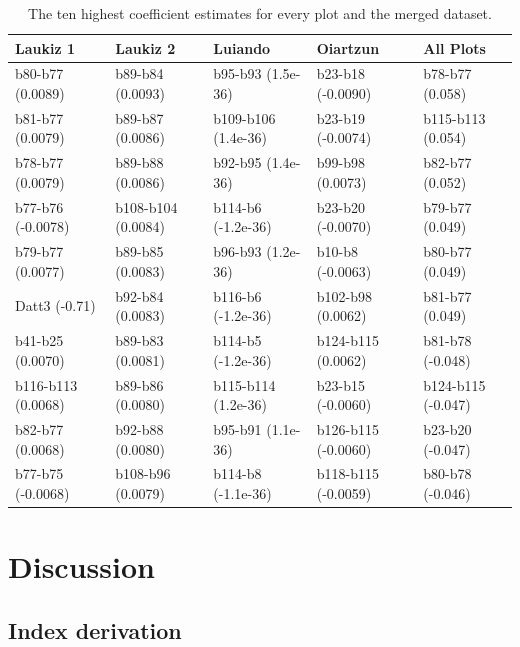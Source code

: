 \documentclass[review]{elsarticle}
\begin{document}
\begin{table}[b!]
\centering
\caption[t]{The ten highest coefficient estimates for every plot and the merged dataset.}
\begingroup\footnotesize
\begin{tabular}{lllll}
	\\
	Laukiz 1           & Laukiz 2           & Luiando             & Oiartzun            & All Plots          \\
	\hline
	b80-b77 (0.0089)   & b89-b84 (0.0093)   & b95-b93 (1.5e-36)   & b23-b18 (-0.0090)   & b78-b77 (0.058)    \\
	b81-b77 (0.0079)   & b89-b87 (0.0086)   & b109-b106 (1.4e-36) & b23-b19 (-0.0074)   & b115-b113 (0.054)  \\
	b78-b77 (0.0079)   & b89-b88 (0.0086)   & b92-b95 (1.4e-36)   & b99-b98 (0.0073)    & b82-b77 (0.052)    \\
	b77-b76 (-0.0078)  & b108-b104 (0.0084) & b114-b6 (-1.2e-36)  & b23-b20 (-0.0070)   & b79-b77 (0.049)    \\
	b79-b77 (0.0077)   & b89-b85 (0.0083)   & b96-b93 (1.2e-36)   & b10-b8 (-0.0063)    & b80-b77 (0.049)    \\
	Datt3 (-0.71)      & b92-b84 (0.0083)   & b116-b6 (-1.2e-36)  & b102-b98 (0.0062)   & b81-b77 (0.049)    \\
	b41-b25 (0.0070)   & b89-b83 (0.0081)   & b114-b5 (-1.2e-36)  & b124-b115 (0.0062)  & b81-b78 (-0.048)   \\
	b116-b113 (0.0068) & b89-b86 (0.0080)   & b115-b114 (1.2e-36) & b23-b15 (-0.0060)   & b124-b115 (-0.047) \\
	b82-b77 (0.0068)   & b92-b88 (0.0080)   & b95-b91 (1.1e-36)   & b126-b115 (-0.0060) & b23-b20 (-0.047)   \\
	b77-b75 (-0.0068)  & b108-b96 (0.0079)  & b114-b8 (-1.1e-36)  & b118-b115 (-0.0059) & b80-b78 (-0.046)   \\
	\bottomrule
\end{tabular}
\endgroup
\label{tab:variable-importance}
\end{table}

\section{Discussion}

\subsection{Index derivation}
\end{document}
